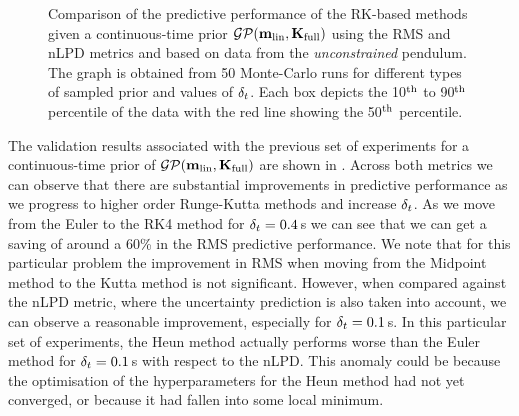 \begin{figure}
{
}
\caption{Comparison of the predictive performance of the RK-based methods given a continuous-time prior $\mathcal{GP}(\mathbf{m}_{\text{lin}},\mathbf{K}_{\text{full}})$ using the RMS and nLPD metrics and based on data from the \textit{unconstrained} pendulum. The graph is obtained from 50 Monte-Carlo runs for different types of sampled prior and values of $\delta_t$. Each box depicts the 10$^{\text{th}}$ to 90$^{\text{th}}$ percentile of the data with the red line showing the 50$^{\text{th}}$ percentile.}
\label{fig:pend_validate}
\end{figure}




The validation results associated with the previous set of experiments for a continuous-time prior of $\mathcal{GP}(\mathbf{m}_{\text{lin}},\mathbf{K}_{\text{full}})$ are shown in . 
%
Across both metrics we can observe that there are substantial improvements in predictive performance as we progress to higher order Runge-Kutta methods and increase $\delta_t$. As we move from the Euler to the RK4 method for $\delta_t=0.4\,$s we can see that we can get a saving of around a 60\% in the RMS predictive performance.  We note that for this particular problem the improvement in RMS when moving from the Midpoint method to the Kutta method is not significant. However, when compared against the nLPD metric, where the uncertainty prediction is also taken into account, we can observe a reasonable improvement, especially for $\delta_t = 0.1\,$s. 
In this particular set of experiments, the Heun method actually performs worse than the Euler method for $\delta_t=0.1\,$s with respect to the nLPD. This anomaly could be because the optimisation of the hyperparameters  for the Heun method had not yet converged, or because it had fallen into some local minimum.











